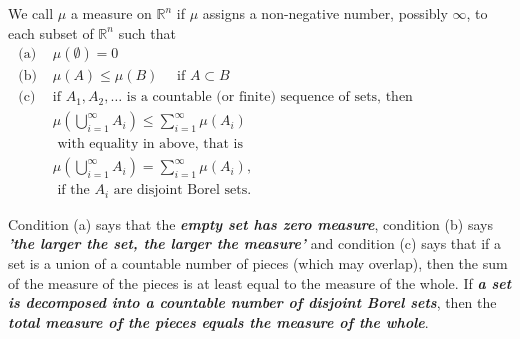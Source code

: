 \begin{definition}[Measure]\label{measure}
    We call $\mu$ a measure on $\mathbb{R}^{n}$ if $\mu$ assigns a non-negative number, possibly $\infty$, to each subset of $\mathbb{R}^{n}$ such that\\
$
\begin{aligned}
\text { (a) }& \mu(\emptyset)=0 \\
\text { (b) }& \mu(A) \leq \mu(B) \quad \text { if } A \subset B \\
\text { (c) }&\text{if } A_{1}, A_{2}, \ldots \text{ is a countable (or finite) sequence of sets, then }\\
& \mu\left(\bigcup_{i=1}^{\infty} A_{i}\right) \leq \sum_{i=1}^{\infty} \mu\left(A_{i}\right)\\
& \text{ with equality in above, that is }\\
& \mu\left(\bigcup_{i=1}^{\infty} A_{i}\right)=\sum_{i=1}^{\infty} \mu\left(A_{i}\right), \\
&\text{ if the }A_i \text{ are disjoint Borel sets.}
\end{aligned}
$
\end{definition}

Condition (a) says that the \textit{\textbf{empty set has
zero measure}}, condition (b) says \textit{\textbf{'the larger the set, the larger the measure'}} and condition (c) says that if a set is a union of a countable number of pieces (which may overlap), then the sum of the measure of the pieces is at least equal to the measure of the whole. If \textit{\textbf{a set is decomposed into a countable number of disjoint Borel sets}}, then the \textit{\textbf{total measure of the pieces equals the measure of the whole}}.

